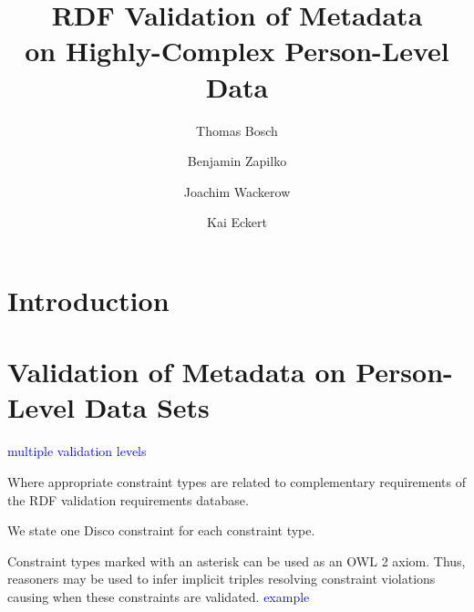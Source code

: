 \documentclass{llncs}
\begin{document}
\renewcommand{\arraystretch}{1.3}
%
%
\title{RDF Validation of Metadata \\ on Highly-Complex Person-Level Data}
\subtitle{}

%
\author{Thomas Bosch \and Benjamin Zapilko \and Joachim Wackerow \and Kai Eckert}
%
\authorrunning{} %
%

\maketitle              %

\begin{abstract}



\end{abstract}

\section{Introduction}

\section{Validation of Metadata on Person-Level Data Sets}

\textcolor{blue}{multiple validation levels}

Where appropriate constraint types are related to complementary requirements of the RDF validation requirements database.

We state one Disco constraint for each constraint type.

Constraint types marked with an asterisk can be used as an OWL 2 axiom.
Thus, reasoners may be used to infer implicit triples resolving constraint violations causing when these constraints are validated.
\textcolor{blue}{example}
\end{document}
